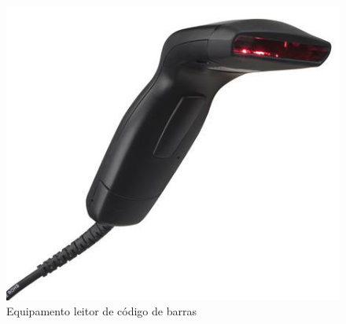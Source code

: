 \begin{figure}[!h]
\centering
\includegraphics[scale=0.65, angle = 360]{figuras/lala5}
\caption[]{Equipamento leitor de código de barras}
\label{Equipamento leitor de código de barras}
\end{figure}
\FloatBarrier

